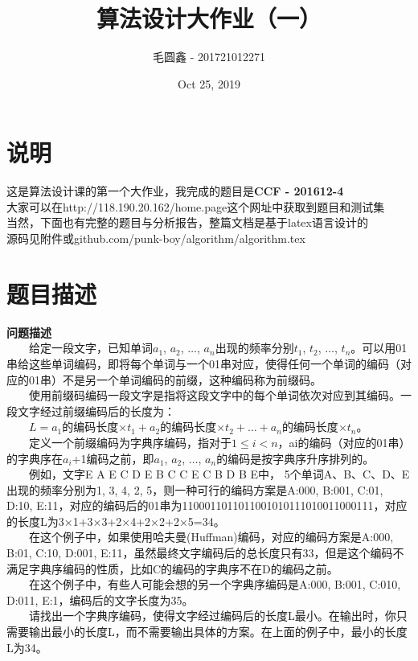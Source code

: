 \documentclass[11pt]{ctexart}
\title{\huge\bf
算法设计大作业（一）}
\author{毛圆鑫 - 201721012271}
\date{Oct 25, 2019}
\begin{document}
\maketitle
\section*{说明}
\noindent 这是算法设计课的第一个大作业，我完成的题目是\textbf{CCF - 201612-4}\\
大家可以在http://118.190.20.162/home.page这个网址中获取到题目和测试集\\
当然，下面也有完整的题目与分析报告，整篇文档是基于latex语言设计的\\
源码见附件或github.com/punk-boy/algorithm/algorithm.tex\\


\section{题目描述}
\noindent\textbf{问题描述}\\
　　给定一段文字，已知单词$a_{1}$, $a_{2}$, $\dots$, $a_{n}$出现的频率分别$t_{1}$, $t_{2}$, $\dots$, $t_{n}$。可以用01串给这些单词编码，即将每个单词与一个01串对应，使得任何一个单词的编码（对应的01串）不是另一个单词编码的前缀，这种编码称为前缀码。\\
　　使用前缀码编码一段文字是指将这段文字中的每个单词依次对应到其编码。一段文字经过前缀编码后的长度为：\\
　　$L=a_{1}$的编码长度$\times t_{1}+a_{2}$的编码长度$\times t_{2}+ \dots + a_{n}$的编码长度$\times t_{n}$。\\
　　定义一个前缀编码为字典序编码，指对于$1\leqslant i < n$，ai的编码（对应的01串）的字典序在$a_{i}$+1编码之前，即$a_{1}$, $a_{2}$, $\dots$, $a_{n}$的编码是按字典序升序排列的。\\
　　例如，文字E A E C D E B C C E C B D B E中， 5个单词A、B、C、D、E出现的频率分别为1, 3, 4, 2, 5，则一种可行的编码方案是A:000, B:001, C:01, D:10, E:11，对应的编码后的01串为1100011011011001010111010011000111，对应的长度L为3×1+3×3+2×4+2×2+2×5=34。\\
　　在这个例子中，如果使用哈夫曼(Huffman)编码，对应的编码方案是A:000, B:01, C:10, D:001, E:11，虽然最终文字编码后的总长度只有33，但是这个编码不满足字典序编码的性质，比如C的编码的字典序不在D的编码之前。\\
　　在这个例子中，有些人可能会想的另一个字典序编码是A:000, B:001, C:010, D:011, E:1，编码后的文字长度为35。\\
　　请找出一个字典序编码，使得文字经过编码后的长度L最小。在输出时，你只需要输出最小的长度L，而不需要输出具体的方案。在上面的例子中，最小的长度L为34。\\
\end{document}

